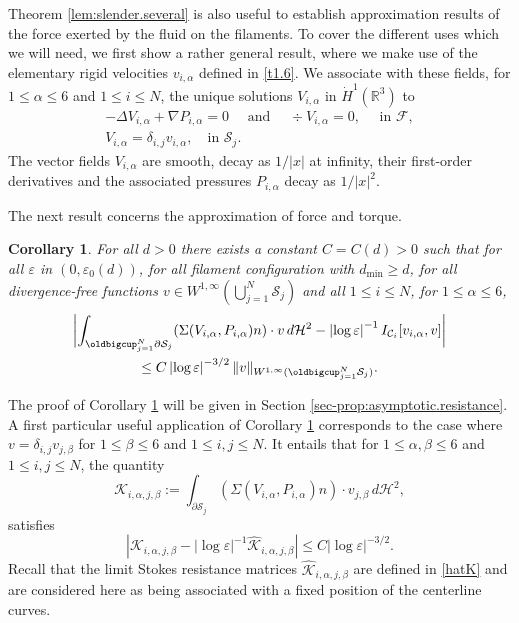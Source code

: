 \documentclass[JEP,XML,SOM,Unicode, NoEqCountersInSection,NoFloatCountersInSection,published]{cedram}
\newcommand{\R}{\mathbb{R}}
\let\eps\varepsilon
\newcommand{\dmin}{d_{\min}}
\newtheorem{cor}[thm]{Corollary}
\theoremstyle{definition}
\theoremstyle{remark}
\begin{document}
Theorem \ref{lem:slender.several} is also useful to establish
approximation results of the force {exerted by the fluid on the filaments.}
To cover the different uses which we will need, we first show a rather general result, where we make use of the elementary rigid velocities $v_{i,\alpha}$ defined in \eqref{t1.6}. We associate with these fields, for $1 \leq \alpha\leq 6$ and $1 \leq i \leq N$, the unique solutions $ V_{i,\alpha}$ in $\dot H^1(\R^3)$ to
\begin{subequations}
\label{sti}
\begin{gather}
\label{sti1}
-\Delta V_{i,\alpha} + \nabla P_{i,\alpha} = 0 \quad \text{ and } \quad \div V_{i,\alpha} = 0, \quad \text{ in } \mathcal F,
\\ \label{sti3}
V_{i,\alpha} = \delta_{i,j} v_{i,\alpha}, \quad \text{in } \mathcal S_j.
\end{gather}
\end{subequations}
The vector fields $ V_{i,\alpha} $ are smooth, decay as $1/ \vert x \vert$ at infinity, their first-order derivatives and the associated pressures $P_{i,\alpha}$ decay as $1/ \vert x \vert^2$.

The next result concerns the approximation of force and torque.
\begin{cor} \label{prop:asymptotic.resistance}
For all $d > 0$ there exists a constant $C = C(d) > 0$ such that for all $\eps $ in $(0, \eps_0(d))$, for all filament configuration with $\dmin \geq d$, for all divergence-free functions $v \in W^{1,\infty}(\bigcup_{j=1}^N \mathcal S_j)$ and all $1 \leq i \leq N$, for $1 \leqslant \alpha \leqslant 6 $,
\begin{multline}
\biggl| \int_{\oldbigcup_{j=1}^N \partial \mathcal S_j} (\Sigma (V_{i,\alpha}, P_{i,\alpha}) n) \cdot v \, d\mathcal{H}^2 - \left|\log \eps\right|^{-1}
I_{\mathcal{C}_i } [v_{i,\alpha}, v]
\biggr| \\
\leq C \left|\log \eps\right|^{- 3/2} \|v\|_{W^{1,\infty}{(\oldbigcup_{j=1}^N \mathcal S_j)}}.
\label{eq:Faxen.force}
\end{multline}
\end{cor}
The proof of Corollary \ref{prop:asymptotic.resistance} will be given in Section \ref{sec-prop:asymptotic.resistance}.
A first particular useful application of Corollary \ref{prop:asymptotic.resistance} corresponds to the case where $v=\delta_{i,j}v_{j,\beta}$ for $1 \leq \beta \leq 6$ and $1 \leq i,j \leq N$. It entails that for $1 \leq \alpha,\beta \leq 6$ and $1 \leq i,j \leq N$, the quantity
\begin{equation} \label{resis}
\mathcal K_{i,\alpha,j,\beta} := \int_{\partial \mathcal S_j} (\Sigma (V_{i,\alpha}, P_{i,\alpha}) n) \cdot v_{j,\beta} \, d\mathcal{H}^2,
\end{equation}
satisfies
\begin{equation}
\left| \mathcal K_{i,\alpha,j,\beta} -
\left|\log \eps\right|^{-1} \hat{\mathcal K}_{i,\alpha,j,\beta}
\right| \leq C \left|\log \eps\right|^{-3/2}. \label{eq:approx.K}
\end{equation}
Recall that the limit Stokes resistance matrices $ \hat{\mathcal K}_{i,\alpha,j,\beta}$ are defined in \eqref{hatK} and are considered here as being associated with a fixed position of the centerline curves.
\end{document}
